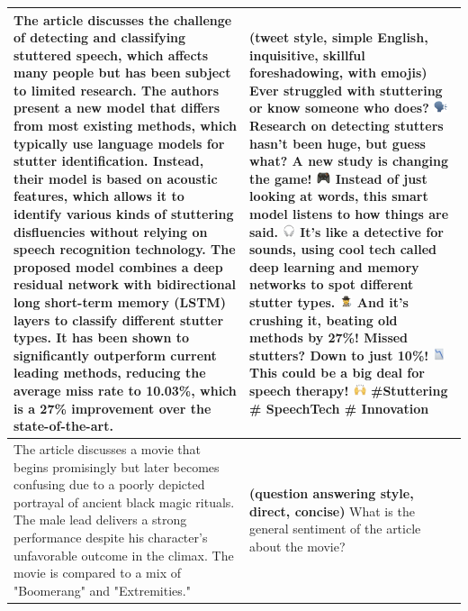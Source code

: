 \begin{table}[h!]
    \centering \small
    \begin{tabular}{p{} p{}}
        \midrule

The article discusses the challenge of detecting and classifying stuttered speech, which affects many people but has been subject to limited research. The authors present a new model that differs from most existing methods, which typically use language models for stutter identification. Instead, their model is based on acoustic features, which allows it to identify various kinds of stuttering disfluencies without relying on speech recognition technology. The proposed model combines a deep residual network with bidirectional long short-term memory (LSTM) layers to classify different stutter types. It has been shown to significantly outperform current leading methods, reducing the average miss rate to 10.03\%, which is a 27\% improvement over the state-of-the-art.
& \textbf{(tweet style, simple English, inquisitive, skillful foreshadowing, with emojis)} \newline 
Ever struggled with stuttering or know someone who does? \includegraphics[height=10pt]{graphs/speaker.png} Research on detecting stutters hasn't been huge, but guess what? A new study is changing the game! \includegraphics[height=10pt]{graphs/game.png} Instead of just looking at words, this smart model listens to how things are said. \includegraphics[height=10pt]{graphs/headphone.png} It's like a detective for sounds, using cool tech called deep learning and memory networks to spot different stutter types. \includegraphics[height=10pt]{graphs/detective.png} And it's crushing it, beating old methods by 27\%! Missed stutters? Down to just 10\%! \includegraphics[height=10pt]{graphs/chart.png} This could be a big deal for speech therapy! \includegraphics[height=10pt]{graphs/hands.png} \#Stuttering \# SpeechTech \# Innovation \\
\midrule
The article discusses a movie that begins promisingly but later becomes confusing due to a poorly depicted portrayal of ancient black magic rituals. The male lead delivers a strong performance despite his character's unfavorable outcome in the climax. The movie is compared to a mix of "Boomerang" and "Extremities."
    & \textbf{(question answering style, direct, concise)} \newline
What is the general sentiment of the article about the movie?


\end{tabular}
\end{table}
